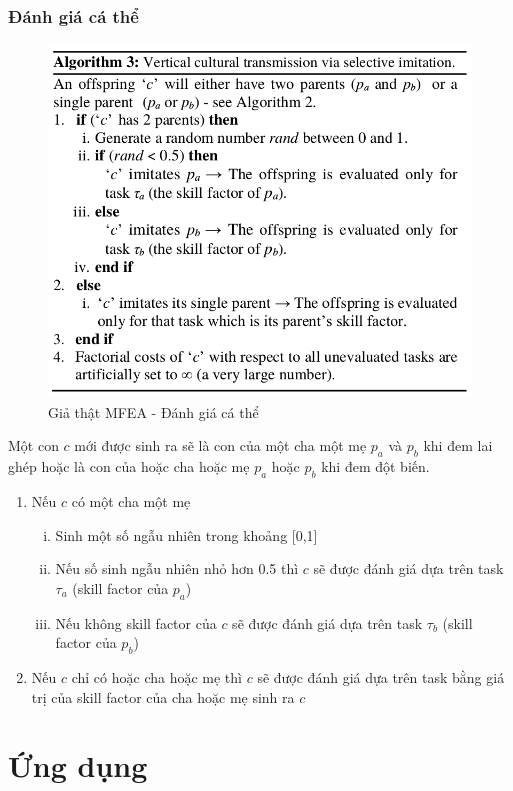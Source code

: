 \documentclass[a4paper,12pt]{report}
\begin{document}
\subsection{Đánh giá cá thể}
\begin{figure}[H]
\centering 
\includegraphics[scale=0.7]{al3.png}
\caption{Giả thật MFEA - Đánh giá cá thể }
\end{figure} 
Một con $c$ mới được sinh ra sẽ là con của một cha một mẹ $p_a$ và $p_b$ khi đem lai ghép hoặc là con của hoặc cha hoặc mẹ $p_a$ hoặc $p_b$ khi đem đột biến.
\begin{enumerate}
\item Nếu $c$ có một cha một mẹ 
\begin{enumerate}[i.]
\item Sinh một số ngẫu nhiên trong khoảng [0,1]
\item Nếu số sinh ngẫu nhiên nhỏ hơn 0.5 thì $c$ sẽ được đánh giá dựa trên task $\tau_a$ (skill factor của $p_a$)
\item Nếu không skill factor của $c$ sẽ được đánh giá dựa trên task $\tau_b$ (skill factor của $p_b$)
\end{enumerate}
\item Nếu $c$ chỉ có hoặc cha hoặc mẹ thì $c$ sẽ được đánh giá dựa trên task bằng giá trị của skill factor của cha hoặc mẹ sinh ra $c$
\end{enumerate}

\chapter{Ứng dụng}
\end{document}
